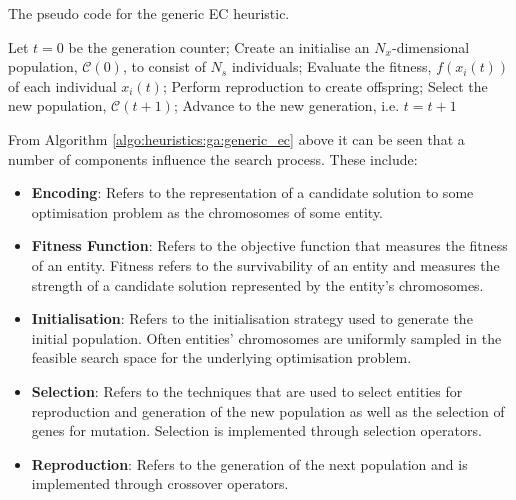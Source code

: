 \begin{algorithm}[H]
      \caption{The pseudo code for the generic \ac{EC} heuristic.}
      \label{algo:heuristics:ga:generic_ec}
      \begin{algorithmic}
            \State Let $t = 0$ be the generation counter;
            \State Create an initialise an $N_{x}$-dimensional population, $\mathcal{C}(0)$, to consist of $N_{s}$ individuals;
            \State Evaluate the fitness, $f(x_{i}(t))$ of each individual $x_{i}(t)$;
            \State Perform reproduction to create offspring;
            \State Select the new population, $\mathcal{C}(t+1)$;
            \State Advance to the new generation, i.e. $t = t + 1$
            \EndWhile
            \State
      \end{algorithmic}
\end{algorithm}

From Algorithm \ref{algo:heuristics:ga:generic_ec} above it can be seen that a number of components influence the search process. These include:

\begin{itemize}
      \item \textbf{Encoding}: Refers to the representation of a candidate solution to some optimisation problem as the chromosomes of some entity.

      \item \textbf{Fitness Function}: Refers to the objective function that measures the fitness of an entity. Fitness refers to the survivability of an entity and measures the strength of a candidate solution represented by the entity's chromosomes.

      \item \textbf{Initialisation}: Refers to the initialisation strategy used to generate the initial population. Often entities' chromosomes are uniformly sampled in the feasible search space for the underlying optimisation problem.

      \item \textbf{Selection}: Refers to the techniques that are used to select entities for reproduction and generation of the new population as well as the selection of genes for mutation. Selection is implemented through selection operators.

      \item \textbf{Reproduction}: Refers to the generation of the next population and is implemented through crossover operators.
\end{itemize}

